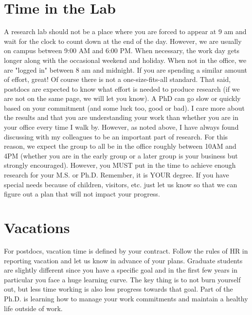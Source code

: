 \documentclass[letterpaper]{article}
\begin{document}
\section*{Time in the Lab}
A research lab should not be a place where you are forced to appear at 9 am and wait for the clock to count down at the end of the day. However, we are usually on campus between 9:00 AM and 6:00 PM. When necessary, the work day gets longer along with the occasional weekend and holiday. When not in the office, we are "logged in" between 8 am and midnight. If you are spending a similar amount of effort, great! Of course there is not a one-size-fits-all standard. That said, postdocs are expected to know what effort is needed to produce research (if we are not on the same page, we will let you know). A PhD can go slow or quickly based on your commitment (and some luck too, good or bad). I care more about the results and that you are understanding your work than whether you are in your office every time I walk by. However, as noted above, I have always found discussing with my colleagues to be an important part of research. For this reason, we expect the group to all be in the office roughly between 10AM and 4PM (whether you are in the early group or a later group is your business but strongly encouraged). However, you MUST put in the time to achieve enough research for your M.S. or Ph.D. Remember, it is YOUR degree. If you have special needs because of children, visitors, etc. just let us know so that we can figure out a plan that will not impact your progress.

\section*{Vacations}
For postdocs, vacation time is defined by your contract. Follow the rules of HR in reporting vacation and let us know in advance of your plans. Graduate students are slightly different since you have a specific goal and in the first few years in particular you face a huge learning curve. The key thing is to not burn yourself out, but less time working is also less progress towards that goal. Part of the Ph.D. is learning how to manage your work commitments and maintain a healthy life outside of work. 
\end{document}
